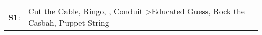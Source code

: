 \begin{supertabular}{p{0.03\textwidth}p{0.92\textwidth}}
 \textbf{S1}:  &  Cut the Cable\textsuperscript{}, \enspace Ringo\textsuperscript{}, \textsuperscript{}, \enspace Conduit\textsuperscript{} \textgreater \enspace Educated Guess\textsuperscript{}, \enspace Rock the Casbah\textsuperscript{}, \enspace Puppet String\textsuperscript{}  \enspace  \\
\end{supertabular}
